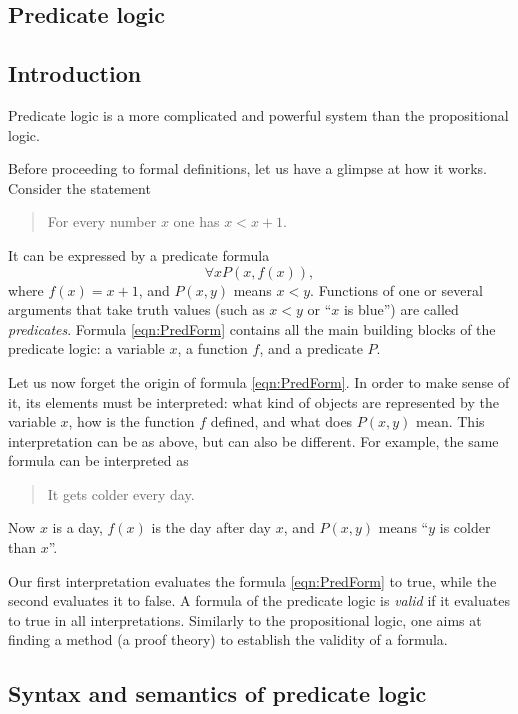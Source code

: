 \begin{page}

\chapter{Predicate logic}
\section*{Introduction}
Predicate logic is a more complicated and powerful system than the propositional logic.

Before proceeding to formal definitions, let us have a glimpse at how it works.
Consider the statement
\begin{quote}
For every number $x$ one has $x < x+1$.
\end{quote}
It can be expressed by a predicate formula
\begin{equation}
\label{eqn:PredForm}
\forall x P(x, f(x)),
\end{equation}
where $f(x) = x+1$, and $P(x,y)$ means $x < y$.
Functions of one or several arguments that take truth values (such as $x < y$ or ``$x$ is blue'') are called \emph{predicates}.
Formula \eqref{eqn:PredForm} contains all the main building blocks of the predicate logic: a variable $x$, a function $f$, and a predicate $P$.

Let us now forget the origin of formula \eqref{eqn:PredForm}.
In order to make sense of it, its elements must be interpreted:
what kind of objects are represented by the variable $x$, how is the function $f$ defined, and what does $P(x,y)$ mean.
This interpretation can be as above, but can also be different.
For example, the same formula can be interpreted as
\begin{quote}
It gets colder every day.
\end{quote}
Now $x$ is a day, $f(x)$ is the day after day $x$, and $P(x,y)$ means ``$y$ is colder than $x$''.

Our first interpretation evaluates the formula \eqref{eqn:PredForm} to true, while the second evaluates it to false.
A formula of the predicate logic is \emph{valid} if it evaluates to true in all interpretations.
Similarly to the propositional logic, one aims at finding a method (a proof theory) to establish the validity of a formula.



\section{Syntax and semantics of predicate logic}

\end{page}
